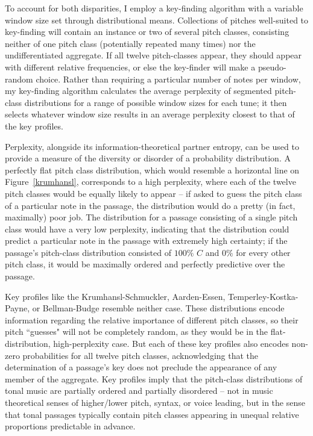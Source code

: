 To account for both disparities, I employ a key-finding algorithm with a variable window size set through distributional means.  Collections of pitches well-suited to key-finding will contain an instance or two of several pitch classes, consisting neither of one pitch class (potentially repeated many times) nor the undifferentiated aggregate.  If all twelve pitch-classes appear, they should appear with different relative frequencies, or else the key-finder will make a pseudo-random choice.  Rather than requiring a particular number of notes per window, my key-finding algorithm calculates the average perplexity of segmented pitch-class distributions for a range of possible window sizes for each tune; it then selects whatever window size results in an average perplexity closest to that of the key profiles.

Perplexity, alongside its information-theoretical partner entropy, can be used to provide a measure of the diversity or disorder of a probability distribution.  A perfectly flat pitch class distribution, which would resemble a horizontal line on Figure~\ref{krumhansl}, corresponds to a high perplexity, where each of the twelve pitch classes would be equally likely to appear -- if asked to guess the pitch class of a particular note in the passage, the distribution would do a pretty (in fact, maximally) poor job.  The distribution for a passage consisting of a single pitch class would have a very low perplexity, indicating that the distribution could predict a particular note in the passage with extremely high certainty; if the passage's pitch-class distribution consisted of $100 \%$ $C$ and $0 \%$ for every other pitch class, it would be maximally ordered and perfectly predictive over the passage.

Key profiles like the Krumhansl-Schmuckler, Aarden-Essen, Temperley-Kostka-Payne, or Bellman-Budge resemble neither case.  These distributions encode information regarding the relative importance of different pitch classes, so their pitch ``guesses" will not be completely random, as they would be in the flat-distribution, high-perplexity case.  But each of these key profiles also encodes non-zero probabilities for all twelve pitch classes, acknowledging that the determination of a passage's key does not preclude the appearance of any member of the aggregate.  Key profiles imply that the pitch-class distributions of tonal music are partially ordered and partially disordered -- not in music theoretical senses of higher/lower pitch, syntax, or voice leading, but in the sense that tonal passages typically contain pitch classes appearing in unequal relative proportions predictable in advance.

